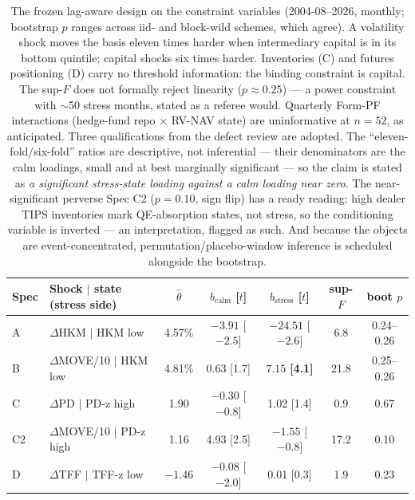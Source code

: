 \documentclass[11pt]{article}
\begin{document}
\begin{table}[h!]
\centering\small
\begin{tabular}{llccccc}
\toprule
Spec & Shock $\mid$ state (stress side) & $\hat\theta$ & $b_{\text{calm}}$ [$t$] & $b_{\text{stress}}$ [$t$] & sup-$F$ & boot $p$ \\
\midrule
A & $\Delta$HKM $\mid$ HKM low & 4.57\% & $-3.91$ [$-2.5$] & $\mathbf{-24.51}$ [$-2.6$] & 6.8 & 0.24--0.26 \\
B & $\Delta$MOVE/10 $\mid$ HKM low & 4.81\% & 0.63 [1.7] & $\mathbf{7.15}$ \textbf{[4.1]} & 21.8 & 0.25--0.26 \\
C & $\Delta$PD $\mid$ PD-z high & 1.90 & $-0.30$ [$-0.8$] & 1.02 [1.4] & 0.9 & 0.67 \\
C2 & $\Delta$MOVE/10 $\mid$ PD-z high & 1.16 & 4.93 [2.5] & $-1.55$ [$-0.8$] & 17.2 & 0.10 \\
D & $\Delta$TFF $\mid$ TFF-z low & $-1.46$ & $-0.08$ [$-2.0$] & 0.01 [0.3] & 1.9 & 0.23 \\
\bottomrule
\end{tabular}
\caption{The frozen lag-aware design on the constraint variables (2004-08--2026, monthly; bootstrap $p$ ranges across iid- and block-wild schemes, which agree). A volatility shock moves the basis eleven times harder when intermediary capital is in its bottom quintile; capital shocks six times harder. Inventories (C) and futures positioning (D) carry no threshold information: the binding constraint is capital. The sup-$F$ does not formally reject linearity ($p\approx0.25$) --- a power constraint with $\sim$50 stress months, stated as a referee would. Quarterly Form-PF interactions (hedge-fund repo $\times$ RV-NAV state) are uninformative at $n=52$, as anticipated. Three qualifications from the defect review are adopted. The ``eleven-fold/six-fold'' ratios are descriptive, not inferential --- their denominators are the calm loadings, small and at best marginally significant --- so the claim is stated as \emph{a significant stress-state loading against a calm loading near zero}. The near-significant perverse Spec C2 ($p=0.10$, sign flip) has a ready reading: high dealer TIPS inventories mark QE-absorption states, not stress, so the conditioning variable is inverted --- an interpretation, flagged as such. And because the objects are event-concentrated, permutation/placebo-window inference is scheduled alongside the bootstrap.}
\end{table}
\end{document}
